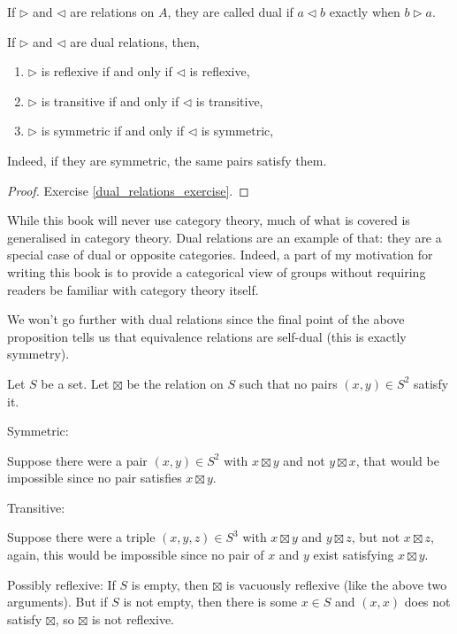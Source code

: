 \begin{definition}
    If $\triangleright$ and $\triangleleft$ are relations on $A$, they are called dual if $a \triangleleft b$ exactly when $b \triangleright a$.
\end{definition}
\begin{proposition}\label{dual_relations_prop}
    If $\triangleright$ and $\triangleleft$ are dual relations, then,
    \begin{enumerate}[label=(\alph*)]
        \item $\triangleright$ is reflexive if and only if $\triangleleft$ is reflexive,
        \item $\triangleright$ is transitive if and only if $\triangleleft$ is transitive,
        \item $\triangleright$ is symmetric if and only if $\triangleleft$ is symmetric,
    \end{enumerate} 
    Indeed, if they are symmetric, the same pairs satisfy them.
\end{proposition}
\begin{proof}
    Exercise \ref{dual_relations_exercise}.
\end{proof}
\begin{remark}
    While this book will never use category theory, much of what is covered is generalised in category theory. Dual relations are an example of that: 
    they are a special case of dual or opposite categories. Indeed, a part of my motivation for writing this book is to provide a categorical view of groups without requiring readers be familiar with category theory itself.
\end{remark}
\begin{remark}
    We won't go further with dual relations since the final point of the above proposition tells us that equivalence relations are self-dual (this is exactly symmetry).
\end{remark}
\begin{example}
    Let $S$ be a set. Let $\boxtimes$ be the relation on $S$ such that no pairs $(x,y) \in S^2$ satisfy it. 
    
    \medskip\noindent
    Symmetric:
    
    \noindent
    Suppose there were a pair $(x,y)\in S^2$ with $x \boxtimes y$ and not $y \boxtimes x$, that would be impossible since no pair satisfies $x \boxtimes y$.

    \medskip\noindent
    Transitive:

    \noindent
    Suppose there were a triple $(x,y,z)\in S^3$ with $x \boxtimes y$ and $y \boxtimes z$, but not $x \boxtimes z$, again, this would be impossible since no pair of $x$ and $y$ exist satisfying $x \boxtimes y$.

    \medskip\noindent
    Possibly reflexive:
    If $S$ is empty, then $\boxtimes$ is vacuously reflexive (like the above two arguments). But if $S$ is not empty, then there is some $x \in S$ and $(x,x)$ does not satisfy $\boxtimes$, so $\boxtimes$ is not reflexive.
\end{example}

